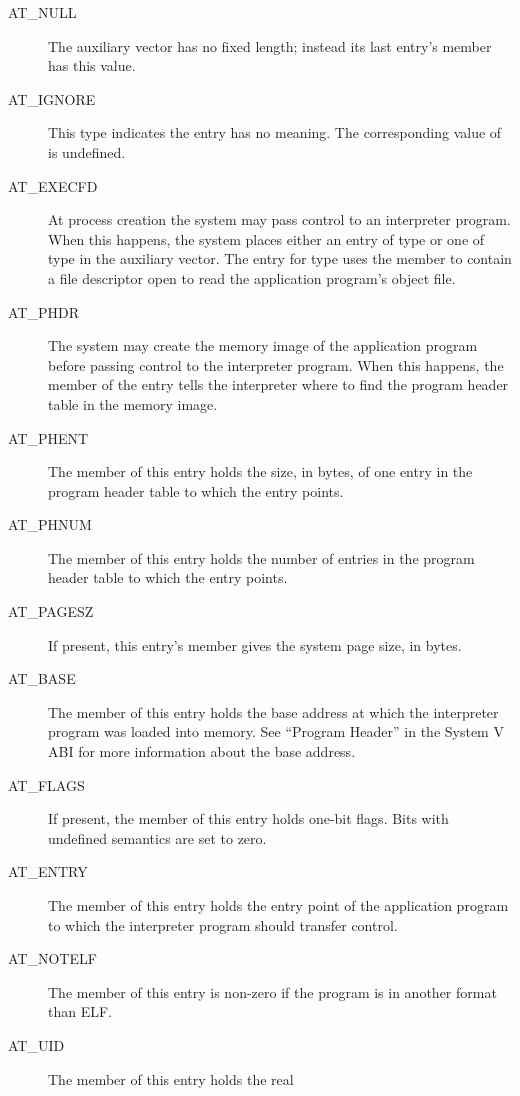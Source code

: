 \begin{description}
\item[AT_NULL] The auxiliary vector has no fixed length; instead its
  last entry's  member has this value.
\item[AT_IGNORE] This type indicates the entry has no meaning. The
  corresponding value of  is undefined.
\item[AT_EXECFD] At process creation the system may pass control to an
  interpreter program. When this happens, the system places either an
  entry of type  or one of type  in the
  auxiliary vector. The entry for type  uses the
   member to contain a file descriptor open to read the
  application program's object file.
\item[AT_PHDR] The system may create the memory image of the
  application program before passing control to the interpreter program.
  When this happens, the  member of the 
  entry tells the interpreter where to find the program header table in
  the memory image.
\item[AT_PHENT] The  member of this entry holds the size,
  in bytes, of one entry in the program header table to which the
   entry points.
\item[AT_PHNUM] The  member of this entry holds the number of
  entries in the program header table to which the  entry
  points.
\item[AT_PAGESZ] If present, this entry's  member gives the
  system page size, in bytes.
\item[AT_BASE] The  member of this entry holds the base address
  at which the interpreter program was loaded into memory. See ``Program
  Header'' in the System V ABI for more information about the base
  address.
\item[AT_FLAGS] If present, the  member of this entry holds
  one-bit flags.  Bits with undefined semantics are set to zero.
\item[AT_ENTRY] The  member of this entry holds the entry point
  of the application program to which the interpreter program should
  transfer control.
\item[AT_NOTELF] The  member of this entry is non-zero if
  the program is in another format than ELF.
\item[AT_UID] The  member of this entry holds the real

\end{description}

